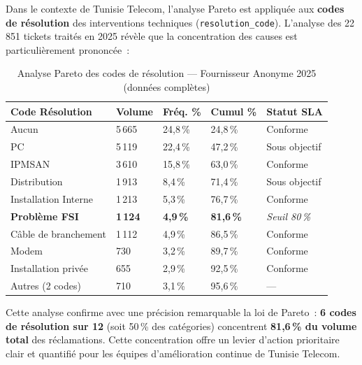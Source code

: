 \documentclass[10pt,a4paper]{report}
\begin{document}
Dans le contexte de Tunisie Telecom, l'analyse Pareto est appliquée aux \textbf{codes de résolution} des interventions techniques (\texttt{resolution\_code}). L'analyse des 22\,851 tickets traités en 2025 révèle que la concentration des causes est particulièrement prononcée~:

\begin{table}[H]
\centering
\caption{Analyse Pareto des codes de résolution --- Fournisseur Anonyme 2025 (données complètes)}
\begin{tabularx}{\textwidth}{L{4cm} C{2cm} C{2.5cm} C{2.5cm} L{3cm}}
\toprule
{}
\textbf{\color{ttblue}Code Résolution} & \textbf{\color{ttblue}Volume} & \textbf{\color{ttblue}Fréq. \%} & \textbf{\color{ttblue}Cumul \%} & \textbf{\color{ttblue}Statut SLA} \\
\midrule
Aucun                   & 5\,665 & 24,8\,\% & 24,8\,\% & Conforme \\
PC                      & 5\,119 & 22,4\,\% & 47,2\,\% & Sous objectif \\
IPMSAN                  & 3\,610 & 15,8\,\% & 63,0\,\% & Conforme \\
Distribution            & 1\,913 &  8,4\,\% & 71,4\,\% & Sous objectif \\
Installation Interne    & 1\,213 &  5,3\,\% & 76,7\,\% & Conforme \\
\textbf{Problème FSI}   & \textbf{1\,124} & \textbf{4,9\,\%} & \textbf{81,6\,\%} & \textit{Seuil 80\,\%} \\
Câble de branchement    & 1\,112 &  4,9\,\% & 86,5\,\% & Conforme \\
Modem                   &   730  &  3,2\,\% & 89,7\,\% & Conforme \\
Installation privée     &   655  &  2,9\,\% & 92,5\,\% & Conforme \\
Autres (2 codes)        &   710  &  3,1\,\% & 95,6\,\% & --- \\
\bottomrule
\end{tabularx}
\label{tab:pareto-full}
\end{table}

Cette analyse confirme avec une précision remarquable la loi de Pareto~: \textbf{6 codes de résolution sur 12} (soit 50\,\% des catégories) concentrent \textbf{81,6\,\% du volume total} des réclamations. Cette concentration offre un levier d'action prioritaire clair et quantifié pour les équipes d'amélioration continue de Tunisie Telecom.
\end{document}
